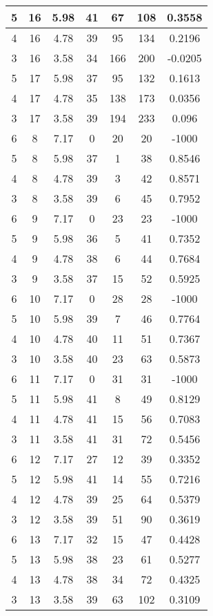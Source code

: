 \documentclass[letterpaper, 12pt]{article}
\begin{document}
\begin{longtable}{|c|c|c|c|c|c|c|}
\hline
5 & 16 & 5.98 & 41 & 67 & 108 & 0.3558 \\
\hline
4 & 16 & 4.78 & 39 & 95 & 134 & 0.2196 \\
\hline
3 & 16 & 3.58 & 34 & 166 & 200 & -0.0205 \\
\hline
5 & 17 & 5.98 & 37 & 95 & 132 & 0.1613 \\
\hline
4 & 17 & 4.78 & 35 & 138 & 173 & 0.0356 \\
\hline
3 & 17 & 3.58 & 39 & 194 & 233 & 0.096 \\
\hline
6 & 8 & 7.17 & 0 & 20 & 20 & -1000 \\
\hline
5 & 8 & 5.98 & 37 & 1 & 38 & 0.8546 \\
\hline
4 & 8 & 4.78 & 39 & 3 & 42 & 0.8571 \\
\hline
3 & 8 & 3.58 & 39 & 6 & 45 & 0.7952 \\
\hline
6 & 9 & 7.17 & 0 & 23 & 23 & -1000 \\
\hline
5 & 9 & 5.98 & 36 & 5 & 41 & 0.7352 \\
\hline
4 & 9 & 4.78 & 38 & 6 & 44 & 0.7684 \\
\hline
3 & 9 & 3.58 & 37 & 15 & 52 & 0.5925 \\
\hline
6 & 10 & 7.17 & 0 & 28 & 28 & -1000 \\
\hline
5 & 10 & 5.98 & 39 & 7 & 46 & 0.7764 \\
\hline
4 & 10 & 4.78 & 40 & 11 & 51 & 0.7367 \\
\hline
3 & 10 & 3.58 & 40 & 23 & 63 & 0.5873 \\
\hline
6 & 11 & 7.17 & 0 & 31 & 31 & -1000 \\
\hline
5 & 11 & 5.98 & 41 & 8 & 49 & 0.8129 \\
\hline
4 & 11 & 4.78 & 41 & 15 & 56 & 0.7083 \\
\hline
3 & 11 & 3.58 & 41 & 31 & 72 & 0.5456 \\
\hline
6 & 12 & 7.17 & 27 & 12 & 39 & 0.3352 \\
\hline
5 & 12 & 5.98 & 41 & 14 & 55 & 0.7216 \\
\hline
4 & 12 & 4.78 & 39 & 25 & 64 & 0.5379 \\
\hline
3 & 12 & 3.58 & 39 & 51 & 90 & 0.3619 \\
\hline
6 & 13 & 7.17 & 32 & 15 & 47 & 0.4428 \\
\hline
5 & 13 & 5.98 & 38 & 23 & 61 & 0.5277 \\
\hline
4 & 13 & 4.78 & 38 & 34 & 72 & 0.4325 \\
\hline
3 & 13 & 3.58 & 39 & 63 & 102 & 0.3109 \\

\end{longtable}
\end{document}
